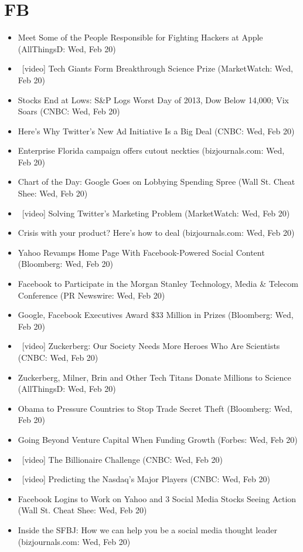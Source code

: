 \documentclass[11pt,asymmetric]{article}
\begin{document}
\section*{FB}
\begin{itemize}
\item Meet Some of the People Responsible for Fighting Hackers at Apple (AllThingsD: Wed, Feb 20)
\item\ [video] Tech Giants Form Breakthrough Science Prize (MarketWatch: Wed, Feb 20)
\item Stocks End at Lows: S\&P Logs Worst Day of 2013, Dow Below 14,000; Vix Soars (CNBC: Wed, Feb 20)
\item Here's Why Twitter's New Ad Initiative Is a Big Deal (CNBC: Wed, Feb 20)
\item Enterprise Florida campaign offers cutout neckties (bizjournals.com: Wed, Feb 20)
\item Chart of the Day: Google Goes on Lobbying Spending Spree (Wall St. Cheat Shee: Wed, Feb 20)
\item\ [video] Solving Twitter's Marketing Problem (MarketWatch: Wed, Feb 20)
\item Crisis with your product? Here’s how to deal (bizjournals.com: Wed, Feb 20)
\item Yahoo Revamps Home Page With Facebook-Powered Social Content (Bloomberg: Wed, Feb 20)
\item Facebook to Participate in the Morgan Stanley Technology, Media \& Telecom Conference (PR Newswire: Wed, Feb 20)
\item Google, Facebook Executives Award \$33 Million in Prizes (Bloomberg: Wed, Feb 20)
\item\ [video] Zuckerberg: Our Society Needs More Heroes Who Are Scientists (CNBC: Wed, Feb 20)
\item Zuckerberg, Milner, Brin and Other Tech Titans Donate Millions to Science (AllThingsD: Wed, Feb 20)
\item Obama to Pressure Countries to Stop Trade Secret Theft (Bloomberg: Wed, Feb 20)
\item Going Beyond Venture Capital When Funding Growth (Forbes: Wed, Feb 20)
\item\ [video] The Billionaire Challenge (CNBC: Wed, Feb 20)
\item\ [video] Predicting the Nasdaq's Major Players (CNBC: Wed, Feb 20)
\item Facebook Logins to Work on Yahoo and 3 Social Media Stocks Seeing Action (Wall St. Cheat Shee: Wed, Feb 20)
\item Inside the SFBJ: How we can help you be a social media thought leader (bizjournals.com: Wed, Feb 20)

\end{itemize}
\end{document}
